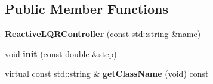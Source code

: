 \subsection*{Public Member Functions}
\begin{DoxyCompactItemize}
\item 
{\bfseries Reactive\+L\+Q\+R\+Controller} (const std\+::string \&name)\hypertarget{classdynamicgraph_1_1sot_1_1ReactiveLQRController_adadf8983289573506586a2816bafd341}{}\label{classdynamicgraph_1_1sot_1_1ReactiveLQRController_adadf8983289573506586a2816bafd341}

\item 
void {\bfseries init} (const double \&step)\hypertarget{classdynamicgraph_1_1sot_1_1ReactiveLQRController_a451edaa3e541b7cebd4cb35c60df3d5f}{}\label{classdynamicgraph_1_1sot_1_1ReactiveLQRController_a451edaa3e541b7cebd4cb35c60df3d5f}

\item 
virtual const std\+::string \& {\bfseries get\+Class\+Name} (void) const \hypertarget{classdynamicgraph_1_1sot_1_1ReactiveLQRController_a9ce5a32886f5a7ed3690a1a1e04c64f1}{}\label{classdynamicgraph_1_1sot_1_1ReactiveLQRController_a9ce5a32886f5a7ed3690a1a1e04c64f1}

\end{DoxyCompactItemize}
